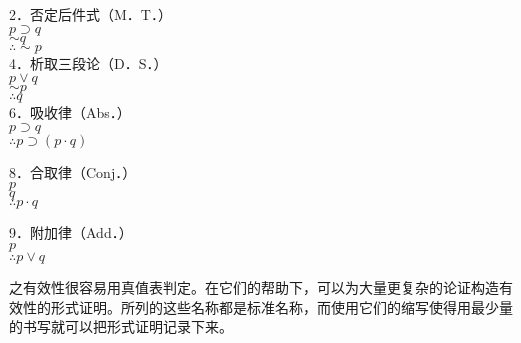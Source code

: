 2．否定后件式（M．T．）\\
$p \supset q$\\
$\sim q$\\
$\therefore \sim p$\\
4．析取三段论（D．S．）\\
$p \vee q$\\
$\sim p$\\
$\therefore q$\\
6．吸收律（Abs．）\\
$p \supset q$\\
$\therefore p \supset(p \cdot q)$

8．合取律（Conj．）\\
$p$\\
$q$\\
$\therefore p \cdot q$

9．附加律（Add．）\\
$p$\\
$\therefore p \vee q$

之有效性很容易用真值表判定。在它们的帮助下，可以为大量更复杂的论证构造有效性的形式证明。所列的这些名称都是标准名称，而使用它们的缩写使得用最少量的书写就可以把形式证明记录下来。 
